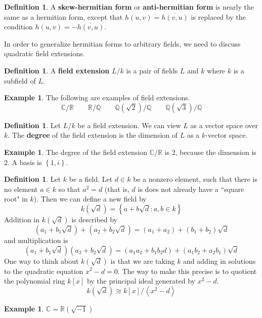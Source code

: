 \documentclass[12pt]{article}
\theoremstyle{definition}
\newtheorem{definition}[theorem]{Definition}
\newtheorem{example}[theorem]{Example}
\newcommand{\Q}{\mathbb{Q}}
\newcommand{\R}{\mathbb{R}}
\newcommand{\C}{\mathbb{C}}
\newcommand{\lp}{\left(}
\newcommand{\rp}{\right)}
\newcommand{\lb}{\left\{}
\newcommand{\rb}{\right\}}
\newcommand{\la}{\left\langle}
\newcommand{\ra}{\right\rangle}
\newcommand{\tbf}{\textbf}
\newcommand{\noi}{\noindent}
\newcommand{\ov}{\overline}
\newcommand{\iso}{\cong}
\begin{document}
\begin{definition}
A \tbf{skew-hermitian form} or \tbf{anti-hermitian form} is nearly the same as a hermitian form, except that $h(u,v) = \ov{h(v,u)}$ is replaced by the condition $h(u,v) = - \ov{h(v,u)}$.
\end{definition}

\noi In order to generalize hermitian forms to arbitrary fields, we need to discuss quadratic field extensions.

\begin{definition}
A \tbf{field extension} $L/k$ is a pair of fields $L$ and $k$ where $k$ is a subfield of $L$.
\end{definition}

\begin{example}
The following are examples of field extensions.
\[
	\C/\R \qquad \R/\Q \qquad \Q ( \sqrt{2} ) /\Q \qquad \Q(\sqrt{3})/\Q
\]
\end{example}

\begin{definition}
Let $L/k$ be a field extension. We can view $L$ as a vector space over $k$. The \tbf{degree} of the field extension is the dimension of $L$ as a $k$-vector space.
\end{definition}

\begin{example}
The degree of the field extension $\C/\R$ is 2, because the dimension is 2. A basis is $\lb 1, i \rb$.
\end{example}

\begin{definition}
Let $k$ be a field. Let $d \in k$ be a nonzero element, such that there is no element $a \in k$ so that $a^2 = d$ (that is, $d$ is does not already have a ``square root" in $k$). Then we can define a new field by
\[
	k \lp \sqrt{d} \rp = \lb a+b \sqrt{d} : a, b \in k \rb
\]
Addition in $k\lp \sqrt{d} \rp$ is described by
\[
	(a_1+b_1 \sqrt{d}) + (a_2 + b_2 \sqrt{d}) = (a_1 + a_2) + (b_1 + b_2) \sqrt{d}
\]
and multiplication is
\[
	(a_1 + b_1 \sqrt{d}) (a_2 + b_2 \sqrt{d}) = (a_1 a_2 + b_1 b_2 d) + (a_1 b_2 + a_2 b_1) \sqrt{d}
\]
One way to think about $k \lp \sqrt{d} \rp$ is that we are taking $k$ and adding in solutions to the quadratic equation $x^2 - d = 0$. The way to make this precise is to quotient the polynomial ring $k[x]$ by the principal ideal generated by $x^2 - d$.
\[
	k\lp \sqrt{d} \rp \iso k[x] / \la x^2 - d \ra
\]
\end{definition}

\begin{example}
 $\C=\R\lp \sqrt{-1} \rp$
\end{example}
\end{document}
